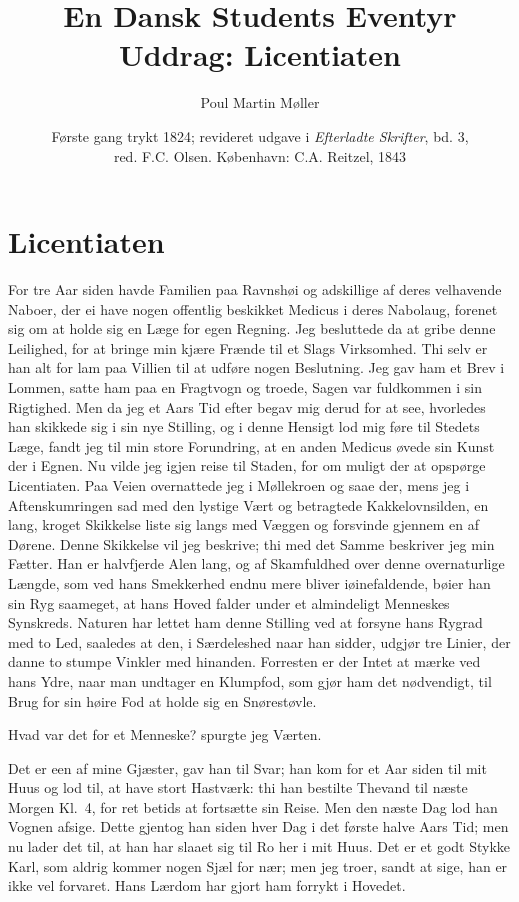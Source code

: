 \documentclass[12pt]{article}
\title{\textbf{En Dansk Students Eventyr}\\[0.5em]
  \large Uddrag: Licentiaten}
\author{Poul Martin Møller}
\date{Første gang trykt 1824; revideret udgave i
  \textit{Efterladte Skrifter}, bd. 3,\\
  red. F.C. Olsen. København: C.A. Reitzel, 1843}
\newcommand{\apage}[1]{\marginnote{\footnotesize\textit{[#1]}}}
\begin{document}
\maketitle

\apage{88} \section*{Licentiaten}

\noindent
For tre Aar siden havde Familien paa Ravnshøi og adskillige af deres
velhavende Naboer, der ei have nogen offentlig beskikket Medicus i
deres Nabolaug, forenet sig om at holde sig en Læge for egen Regning.
Jeg besluttede da at gribe denne Leilighed, for at bringe min kjære
Frænde til et Slags Virksomhed. Thi selv er han alt for lam paa
Villien til at udføre nogen Beslutning. Jeg gav ham et Brev i Lommen,
satte ham paa en Fragtvogn og troede, Sagen var fuldkommen i sin
Rigtighed. Men da jeg et Aars Tid efter begav mig derud for at see,
hvorledes han skikkede sig i sin nye Stilling, og i denne Hensigt lod
mig føre til Stedets Læge, fandt jeg til min store Forundring, at en
anden Medicus øvede sin Kunst der i Egnen. Nu vilde jeg igjen reise
til Staden, for om muligt der at opspørge Licentiaten. Paa Veien
overnattede jeg i Møllekroen og saae der, mens jeg i Aftenskumringen
sad med den lystige Vært og betragtede Kakkelovnsilden, en lang,
kroget Skikkelse liste sig langs med Væggen og forsvinde gjennem en af
Dørene. Denne Skikkelse vil jeg beskrive; thi med det Samme beskriver
jeg min Fætter. Han er halvfjerde Alen lang, og af Skamfuldhed over
denne overnaturlige Længde, som ved hans Smekkerhed endnu mere bliver
iøinefaldende, bøier han sin Ryg saameget, at hans Hoved falder under
et almindeligt Menneskes Synskreds. Naturen har lettet ham denne
Stilling ved at forsyne hans Rygrad med to Led, saaledes at den, i
Særdeleshed naar han sidder, udgjør tre \apage{89}Linier, der danne to stumpe
Vinkler med hinanden. Forresten er der Intet at mærke ved hans Ydre,
naar man undtager en Klumpfod, som gjør ham det nødvendigt, til Brug
for sin høire Fod at holde sig en Snørestøvle.

Hvad var det for et Menneske? spurgte jeg Værten.

Det er een af mine Gjæster, gav han til Svar; han kom for et Aar
siden til mit Huus og lod til, at have stort Hastværk: thi han
bestilte Thevand til næste Morgen Kl.~4, for ret betids at fortsætte
sin Reise. Men den næste Dag lod han Vognen afsige. Dette gjentog han
siden hver Dag i det første halve Aars Tid; men nu lader det til, at
han har slaaet sig til Ro her i mit Huus. Det er et godt Stykke Karl,
som aldrig kommer nogen Sjæl for nær; men jeg troer, sandt at sige,
han er ikke vel forvaret. Hans Lærdom har gjort ham forrykt i Hovedet.
\end{document}
